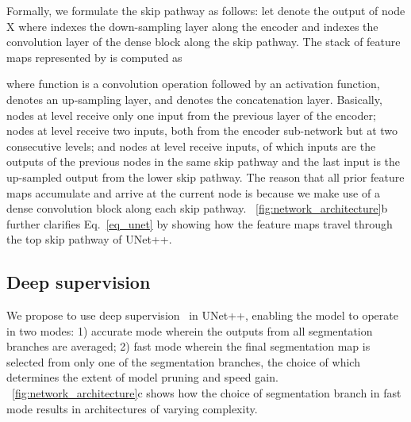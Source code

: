\documentclass[runningheads]{llncs}
\begin{document}
Formally, we formulate the skip pathway as follows: let  denote the output of node X where  indexes the down-sampling layer along the encoder and  indexes the convolution layer of the dense block along the skip pathway. The stack of feature maps represented by  is computed as



\iffalse

\fi




\noindent where function  is a convolution operation followed by an activation function,  denotes an up-sampling layer, and   denotes the concatenation layer. Basically, nodes at level   receive only one input from the previous layer of the encoder; nodes at level  receive two inputs, both from the encoder sub-network but at two consecutive levels; and nodes at level  receive  inputs, of which  inputs are the outputs of the previous  nodes in the same skip pathway and the last input is the up-sampled output from the lower skip pathway. The reason that all prior feature maps accumulate and arrive at the current node is because we make use of a dense convolution block along each skip pathway. \figurename~\ref{fig:network_architecture}b further clarifies Eq.~\ref{eq_unet} by showing how the feature maps travel through the top skip pathway of UNet++.





\iffalse
\begin{figure}[!ht]
\begin{center}
\texttt{[image: ./pics/nablanet\_detailed.png]}
\end{center}
\caption{}
\label{fig:network_architecture_detailed}
\end{figure}
\fi






\subsection{Deep supervision}
We propose to use deep supervision~\cite{lee2015deeply} in UNet++, enabling the model to operate in two modes: 1) accurate mode wherein the outputs from all segmentation branches are averaged; 2) fast mode wherein the final segmentation map is selected from only one of the segmentation branches, the choice of which determines the extent of model pruning and speed gain.  \figurename~\ref{fig:network_architecture}c shows how the choice of segmentation branch in fast mode results in architectures of varying complexity.
\end{document}
